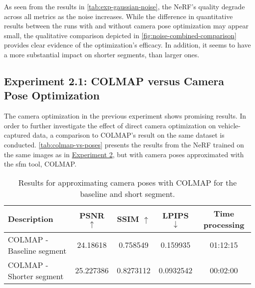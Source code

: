 %
%


As seen from the results in \autoref{tab:exp-gaussian-noise}, the NeRF's quality degrade across all metrics as the noise increases. While the difference in quantitative results between the runs with and without camera pose optimization may appear small, the qualitative comparison depicted in \autoref{fig:noise-combined-comparison} provides clear evidence of the optimization's efficacy. In addition, it seems to have a more substantial impact on shorter segments, than larger ones.

\begin{comment}
Information about GNSS-error
https://junipersys.com/support/article/6614#:~:text=Just%
\end{comment}



\subsection{Experiment 2.1: COLMAP versus Camera Pose Optimization}

The camera optimization in the previous experiment shows promising results. In order to further investigate the effect of direct camera optimization on vehicle-captured data, a comparison to COLMAP's result on the same dataset is conducted. \autoref{tab:colmap-vs-poses} presents the results from the NeRF trained on the same images as in \hyperref[sec:gaussian-noise]{Experiment 2}, but with camera poses approximated with the \acrshort{sfm} tool, COLMAP.

\begin{table}[ht]
\centering
\setlength{\tabcolsep}{6pt}
\renewcommand{\arraystretch}{1.5}
\begin{tabular}{l | C{2.2} C{1.3} C{1.3} c}
\hline
\textbf{Description} & \textbf{PSNR $\uparrow$} & \textbf{SSIM $\uparrow$} & \textbf{LPIPS $\downarrow$} & \textbf{Time processing} \\
\hline
COLMAP - Baseline segment   & 24.18618  & 0.758549  & 0.159935  & 01:12:15 \\
COLMAP - Shorter segment    & 25.227386 & 0.8273112 & 0.0932542 & 00:02:00 \\
\hline
\end{tabular}
\caption[Results for experiment 2.1: COLMAP]{Results for approximating camera poses with COLMAP for the baseline and short segment.}
\label{tab:colmap-vs-poses}
\end{table}

